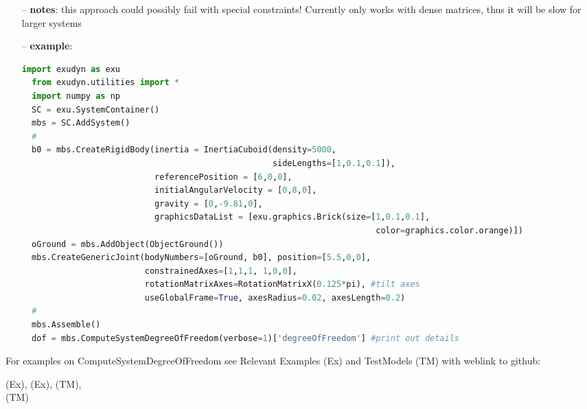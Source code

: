 \begin{itemize}[leftmargin=0.7cm]
\item[--]
{\bf notes}: this approach could possibly fail with special constraints! Currently only works with dense matrices, thus it will be slow for larger systems
\item[--]
{\bf example}: \vspace{-12pt}\ei\begin{lstlisting}[language=Python, xleftmargin=36pt]
  import exudyn as exu
  from exudyn.utilities import *
  import numpy as np
  SC = exu.SystemContainer()
  mbs = SC.AddSystem()
  #
  b0 = mbs.CreateRigidBody(inertia = InertiaCuboid(density=5000,
                                                   sideLengths=[1,0.1,0.1]),
                           referencePosition = [6,0,0],
                           initialAngularVelocity = [0,8,0],
                           gravity = [0,-9.81,0],
                           graphicsDataList = [exu.graphics.Brick(size=[1,0.1,0.1],
                                                                        color=graphics.color.orange)])
  oGround = mbs.AddObject(ObjectGround())
  mbs.CreateGenericJoint(bodyNumbers=[oGround, b0], position=[5.5,0,0],
                         constrainedAxes=[1,1,1, 1,0,0],
                         rotationMatrixAxes=RotationMatrixX(0.125*pi), #tilt axes
                         useGlobalFrame=True, axesRadius=0.02, axesLength=0.2)
  #
  mbs.Assemble()
  dof = mbs.ComputeSystemDegreeOfFreedom(verbose=1)['degreeOfFreedom'] #print out details
\end{lstlisting}\vspace{-24pt}\bi\item[]\vspace{-24pt}\vspace{12pt}\end{itemize}
%

%
\noindent For examples on ComputeSystemDegreeOfFreedom see Relevant Examples (Ex) and TestModels (TM) with weblink to github:
\bi
 \item \footnotesize {} (Ex), 
 (Ex), 
 (TM), 
\\  (TM)
\ei

